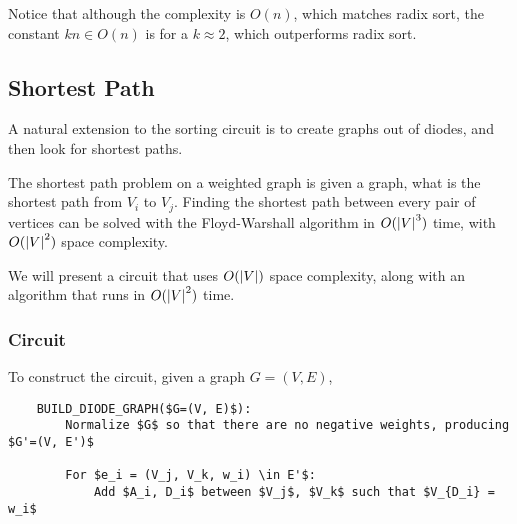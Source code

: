 \documentclass{article}
\begin{document}
Notice that although the complexity is $O(n)$, which matches radix sort,
the constant $kn \in O(n)$ is for a $k \approx 2$, which outperforms radix sort.

\subsection{Shortest Path}
A natural extension to the sorting circuit is to create graphs out of diodes,
and then look for shortest paths.

The shortest path problem on a weighted graph is given a graph, what is the shortest path from $V_i$ to $V_j$.
Finding the shortest path between every pair of vertices can be solved with the Floyd-Warshall algorithm in $O(\abs{V}^3)$ time, with $O(\abs{V}^2)$ space complexity.

We will present a circuit that uses $O(\abs{V})$ space complexity, along with an algorithm that runs in $O(\abs{V}^2)$ time.

\subsubsection{Circuit}

To construct the circuit, given a graph $G=(V, E)$,

\begin{lstlisting}
	BUILD_DIODE_GRAPH($G=(V, E)$):
		Normalize $G$ so that there are no negative weights, producing $G'=(V, E')$

		For $e_i = (V_j, V_k, w_i) \in E'$:
			Add $A_i, D_i$ between $V_j$, $V_k$ such that $V_{D_i} = w_i$
\end{lstlisting}
\end{document}
